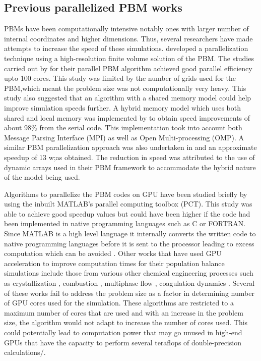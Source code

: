 \documentclass[preprint,10pt,authoryear,review]{elsarticle}
\begin{document}
\subsection{Previous parallelized PBM works}
PBMs have been computationally intensive notably ones with larger number of internal 
coordinates and higher dimensions. Thus, several researchers have made attempts to increase 
the speed of these simulations. \cite{Gunawan2008} developed a parallelization technique 
using a high-resolution finite volume solution of the PBM. The studies carried out by 
\cite{Gunawan2008} for their parallel PBM algorithm achieved good parallel efficiency upto 
100 cores. This study was limited by the number of grids used for the PBM,which meant the 
problem size was not computationally very heavy. This study also suggested that an algorithm 
with a shared memory model could help improve simulation speeds further. A hybrid memory model 
which uses both shared and local memory was implemented by \cite{Bettencourt2017} to 
obtain speed improvements of about 98\% from the serial code. This implementation took 
into account both Message Parsing Interface (MPI) as well as Open Multi-processing (OMP). 
A similar PBM parallelization approach was also undertaken in \cite{Sampat2018} and an 
approximate speedup of 13 w;as obtained. The reduction in speed was attributed to the use of 
dynamic arrays used in their PBM framework to accommodate the hybrid nature of the model 
being used. 

Algorithms to parallelize the PBM codes on GPU have been studied briefly by \cite{Prakash2013b} 
using the inbuilt MATLAB's parallel computing toolbox (PCT). This study was able to achieve 
good speedup values but could have been higher if the code had been implemented in native 
programming languages such as C or FORTRAN. Since MATLAB is a high level language it internally 
converts the written code to native programming languages before it is sent to the processor 
leading to excess computation which can be avoided \citep{pctMatlab}. Other works that have 
used GPU acceleration to improve computation times for their population balance simulations 
include those from various other chemical engineering processes such as crystallization 
\citep{Szilagy2016}, combustion \citep{Shi2012} , multiphase flow \citep{santos2013}, 
coagulation dynamics \citep{Xu2015}. Several of these works fail to address the problem 
size as a factor in determining number of GPU cores used for the simulation. These algorithms 
are restricted to a maximum number of cores that are used and with an increase in the 
problem size, the algorithm would not adapt to increase the number of cores used. 
This could potentially lead to computation power that may go unused in high-end GPUs that 
have the capacity to perform several teraflops of double-precision calculations/.
\end{document}
